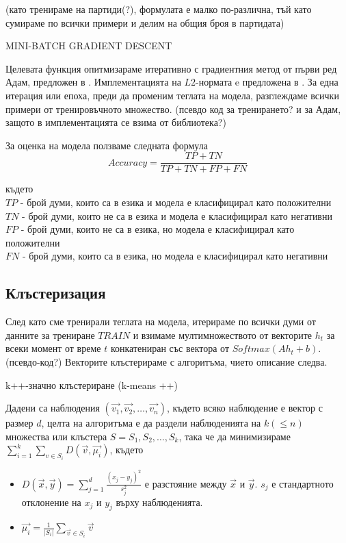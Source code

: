 \documentclass[a4paper,12pt]{article}
\begin{document}
(като тренираме на партиди(?), формулата е малко по-различна, тъй като сумираме по всички примери и делим на общия броя в партидата)

MINI-BATCH GRADIENT DESCENT

Целевата функция опитмизараме итеративно с градиентния метод от първи ред Адам, предложен в \cite{citation07}. Имплементацията на $L2$-нормата e предложена в \cite{citation08}. За една итерация или епоха, преди да променим теглата на модела, разглеждаме всички примери от тренировъчното множество. (псевдо код за тренирането? и за Адам, защото в имплементацията се взима от библиотека?)


За оценка на модела ползваме следната формула
\begin{equation} \label{eqn}
Accuracy = \frac{TP + TN}{TP + TN + FP + FN}
\end{equation}

където\\
$TP$ - брой думи, които са в езика и модела е класифицирал като положителни\\
$TN$ - брой думи, които не са в езика и модела е класифицирал като негативни\\
$FP$ - брой думи, които не са в езика, но модела е класифицирал като положителни\\
$FN$ - брой думи, които са в езика, но модела е класифицирал като негативни\\

\subsection{Клъстеризация}

След като сме тренирали теглата на модела, итерираме по всички думи от данните за трениране $TRAIN$ и взимаме мултимножеството от векторите $h_t$ за всеки момент от време $t$ конкатениран със вектора от $Softmax( A h_t + b )$. (псевдо-код?) Векторите клъстерираме с алгоритъма, чието описание следва.

k++-значно клъстериране (k-means ++)

Дадени са наблюдения $(\vec{v_1}, \vec{v_2},\ldots, \vec{v_n})$, където всяко наблюдение е вектор с размер $d$, целта на алгоритъма е да раздели наблюденията на $k ( \leq n )$ множества или клъстера $S = {S_1, S_2,\ldots, S_k}$, така че да минимизираме $\displaystyle\sum_{i=1}^{k} \sum_{v \in S_i} D(\vec{v}, \vec{\mu_i})$, където 

\begin{itemize}
 \item $D(\vec{x}, \vec{y}) = \displaystyle\sum_{j=1}^{d} \frac{(x_j - y_j)^2}{s_j^2}$ е разстояние между $\vec{x}$ и $\vec{y}$. $s_j$ е стандартното отклонение на $x_j$ и $y_j$ върху наблюденията.
 \item $\vec{\mu_i} = \frac{1}{|S_i|} \displaystyle\sum_{\vec{v} \in S_i}{\vec{v}}$
\end{itemize}
\end{document}
